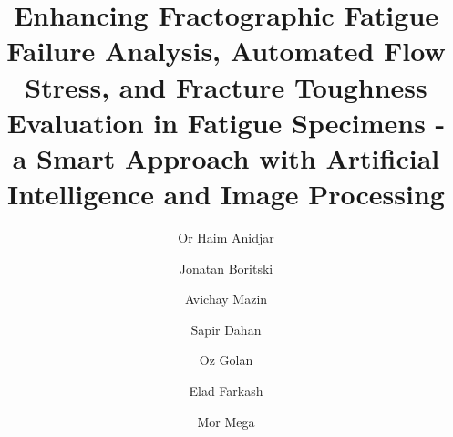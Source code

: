 \documentclass[preprint,12pt]{elsarticle}
\begin{document}
\begin{frontmatter}



\title{Enhancing Fractographic Fatigue Failure Analysis, Automated Flow Stress, and Fracture Toughness Evaluation in Fatigue Specimens - a Smart Approach with Artificial Intelligence and Image Processing}

\author[Computer_b]{Or Haim Anidjar}
\author[Computer_a]{Jonatan Boritski}
\author[Computer_a]{Avichay Mazin}
\author[Computer_a]{Sapir Dahan}
\author[Afeka]{Oz Golan}
\author[soreq]{Elad Farkash}
\author[fracture]{Mor Mega}




\end{frontmatter}
\end{document}
